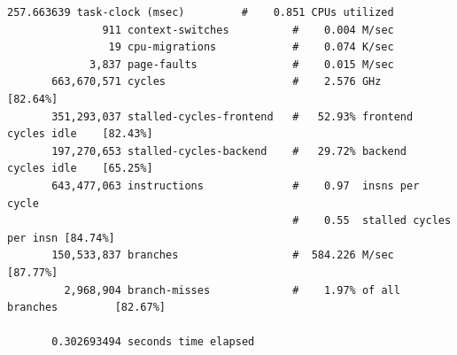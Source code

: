 \documentclass[8pt,a4paper]{report}
\begin{document}
\begin{Verbatim}[fontsize=\small]
        257.663639 task-clock (msec)         #    0.851 CPUs utilized          
               911 context-switches          #    0.004 M/sec                  
                19 cpu-migrations            #    0.074 K/sec                  
             3,837 page-faults               #    0.015 M/sec                  
       663,670,571 cycles                    #    2.576 GHz                     [82.64%]
       351,293,037 stalled-cycles-frontend   #   52.93% frontend cycles idle    [82.43%]
       197,270,653 stalled-cycles-backend    #   29.72% backend  cycles idle    [65.25%]
       643,477,063 instructions              #    0.97  insns per cycle        
                                             #    0.55  stalled cycles per insn [84.74%]
       150,533,837 branches                  #  584.226 M/sec                   [87.77%]
         2,968,904 branch-misses             #    1.97% of all branches         [82.67%]

       0.302693494 seconds time elapsed
\end{Verbatim}
\end{document}
